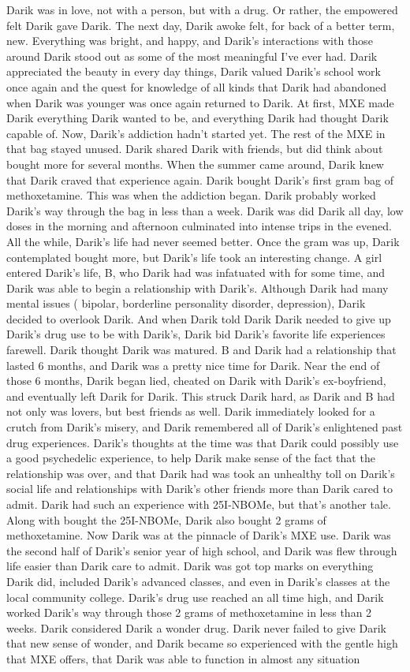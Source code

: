\documentclass[12pt]{book}
\begin{document}
Darik was in love, not with a person, but with a drug. Or rather, the empowered felt Darik gave Darik. The next day, Darik awoke felt, for back of a better term, new. Everything was bright, and happy, and Darik's interactions with those around Darik stood out as some of the most meaningful I've ever had. Darik appreciated the beauty in every day things, Darik valued Darik's school work once again and the quest for knowledge of all kinds that Darik had abandoned when Darik was younger was once again returned to Darik. At first, MXE made Darik everything Darik wanted to be, and everything Darik had thought Darik capable of. Now, Darik's addiction hadn't started yet. The rest of the MXE in that bag stayed unused. Darik shared Darik with friends, but did think about bought more for several months. When the summer came around, Darik knew that Darik craved that experience again. Darik bought Darik's first gram bag of methoxetamine. This was when the addiction began. Darik probably worked Darik's way through the bag in less than a week. Darik was did Darik all day, low doses in the morning and afternoon culminated into intense trips in the evened. All the while, Darik's life had never seemed better. Once the gram was up, Darik contemplated bought more, but Darik's life took an interesting change. A girl entered Darik's life, B, who Darik had was infatuated with for some time, and Darik was able to begin a relationship with Darik's. Although Darik had many mental issues ( bipolar, borderline personality disorder, depression), Darik decided to overlook Darik. And when Darik told Darik Darik needed to give up Darik's drug use to be with Darik's, Darik bid Darik's favorite life experiences farewell. Darik thought Darik was matured. B and Darik had a relationship that lasted 6 months, and Darik was a pretty nice time for Darik. Near the end of those 6 months, Darik began lied, cheated on Darik with Darik's ex-boyfriend, and eventually left Darik for Darik. This struck Darik hard, as Darik and B had not only was lovers, but best friends as well. Darik immediately looked for a crutch from Darik's misery, and Darik remembered all of Darik's enlightened past drug experiences. Darik's thoughts at the time was that Darik could possibly use a good psychedelic experience, to help Darik make sense of the fact that the relationship was over, and that Darik had was took an unhealthy toll on Darik's social life and relationships with Darik's other friends more than Darik cared to admit. Darik had such an experience with 25I-NBOMe, but that's another tale. Along with bought the 25I-NBOMe, Darik also bought 2 grams of methoxetamine. Now Darik was at the pinnacle of Darik's MXE use. Darik was the second half of Darik's senior year of high school, and Darik was flew through life easier than Darik care to admit. Darik was got top marks on everything Darik did, included Darik's advanced classes, and even in Darik's classes at the local community college. Darik's drug use reached an all time high, and Darik worked Darik's way through those 2 grams of methoxetamine in less than 2 weeks. Darik considered Darik a wonder drug. Darik never failed to give Darik that new sense of wonder, and Darik became so experienced with the gentle high that MXE offers, that Darik was able to function in almost any situation 
\end{document}
